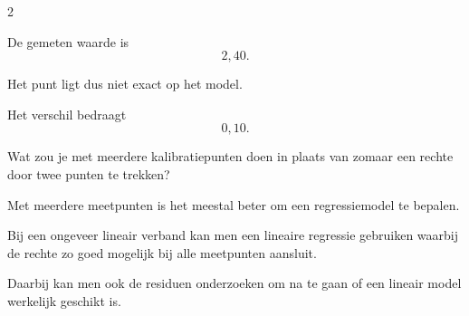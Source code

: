 \documentclass{ximera}
\begin{document}
\begin{oefening}{\oefG}
\begin{multicols}{2}
\begin{question}
\begin{oplossing}
    De gemeten waarde is
    \[
    2{,}40.
    \]
    
    Het punt ligt dus niet exact op het model.
    
    Het verschil bedraagt
    \[
    0{,}10.
    \]
    \end{oplossing}
    \end{question}
    
    
    \begin{question}
    Wat zou je met meerdere kalibratiepunten doen in plaats van zomaar een rechte door twee punten te trekken?
    
    \begin{oplossing}
    Met meerdere meetpunten is het meestal beter om een regressiemodel te bepalen.
    
    Bij een ongeveer lineair verband kan men een lineaire regressie gebruiken waarbij de rechte zo goed mogelijk bij alle meetpunten aansluit.
    
    Daarbij kan men ook de residuen onderzoeken om na te gaan of een lineair model werkelijk geschikt is.
    \end{oplossing}
    \end{question}
    
    \end{multicols}
    
    \end{oefening}
    
    
\end{document}
